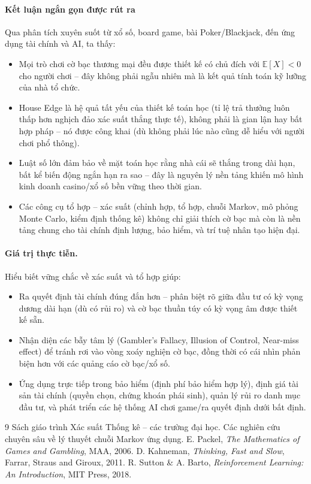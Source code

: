 \documentclass[12pt,a4paper]{article}
\theoremstyle{coloredthm}
\theoremstyle{coloreddef}
\theoremstyle{remark}
\begin{document}
\paragraph{Kết luận ngắn gọn được rút ra} Qua phân tích xuyên suốt từ xổ số, board game, bài Poker/Blackjack, đến ứng dụng tài chính và AI, ta thấy:
\begin{itemize}
    \item Mọi trò chơi cờ bạc thương mại đều được thiết kế có chủ đích với $\mathbb{E}[X] < 0$ cho người chơi -- đây không phải ngẫu nhiên mà là kết quả tính toán kỹ lưỡng của nhà tổ chức.
    \item House Edge là hệ quả tất yếu của thiết kế toán học (tỉ lệ trả thưởng luôn thấp hơn nghịch đảo xác suất thắng thực tế), không phải là gian lận hay bất hợp pháp -- nó được công khai (dù không phải lúc nào cũng dễ hiểu với người chơi phổ thông).
    \item Luật số lớn đảm bảo về mặt toán học rằng nhà cái sẽ thắng trong dài hạn, bất kể biến động ngắn hạn ra sao -- đây là nguyên lý nền tảng khiến mô hình kinh doanh casino/xổ số bền vững theo thời gian.
    \item Các công cụ tổ hợp -- xác suất (chỉnh hợp, tổ hợp, chuỗi Markov, mô phỏng Monte Carlo, kiểm định thống kê) không chỉ giải thích cờ bạc mà còn là nền tảng chung cho tài chính định lượng, bảo hiểm, và trí tuệ nhân tạo hiện đại.
\end{itemize}

\paragraph{Giá trị thực tiễn.} Hiểu biết vững chắc về xác suất và tổ hợp giúp:
\begin{itemize}
    \item Ra quyết định tài chính đúng đắn hơn -- phân biệt rõ giữa đầu tư có kỳ vọng dương dài hạn (dù có rủi ro) và cờ bạc thuần túy có kỳ vọng âm được thiết kế sẵn.
    \item Nhận diện các bẫy tâm lý (Gambler's Fallacy, Illusion of Control, Near-miss effect) để tránh rơi vào vòng xoáy nghiện cờ bạc, đồng thời có cái nhìn phản biện hơn với các quảng cáo cờ bạc/xổ số.
    \item Ứng dụng trực tiếp trong bảo hiểm (định phí bảo hiểm hợp lý), định giá tài sản tài chính (quyền chọn, chứng khoán phái sinh), quản lý rủi ro danh mục đầu tư, và phát triển các hệ thống AI chơi game/ra quyết định dưới bất định.
\end{itemize}

\newpage
\begin{thebibliography}{9}
 Sách giáo trình Xác suất Thống kê -- các trường đại học.
 Các nghiên cứu chuyên sâu về lý thuyết chuỗi Markov ứng dụng.
 E. Packel, \emph{The Mathematics of Games and Gambling}, MAA, 2006.
 D. Kahneman, \emph{Thinking, Fast and Slow}, Farrar, Straus and Giroux, 2011.
 R. Sutton \& A. Barto, \emph{Reinforcement Learning: An Introduction}, MIT Press, 2018.
\end{thebibliography}
\end{document}
